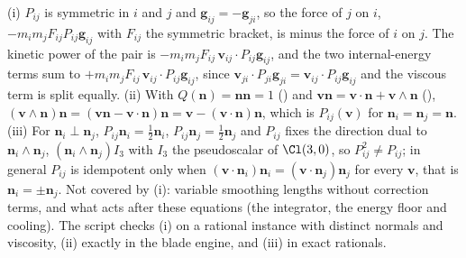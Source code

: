 (i) $P_{ij}$ is symmetric in $i$ and $j$ and $\mathbf{g}_{ij} = -\mathbf{g}_{ji}$, so the force of $j$ on $i$, $-m_{i}m_{j}F_{ij}P_{ij}\mathbf{g}_{ij}$ with $F_{ij}$ the symmetric bracket, is minus the force of $i$ on $j$. The kinetic power of the pair is $-m_{i}m_{j}F_{ij}\,\mathbf{v}_{ij}\cdot P_{ij}\mathbf{g}_{ij}$, and the two internal-energy terms sum to $+m_{i}m_{j}F_{ij}\,\mathbf{v}_{ij}\cdot P_{ij}\mathbf{g}_{ij}$, since $\mathbf{v}_{ji}\cdot P_{ji}\mathbf{g}_{ji} = \mathbf{v}_{ij}\cdot P_{ij}\mathbf{g}_{ij}$ and the viscous term is split equally. (ii) With $Q(\mathbf{n}) = \mathbf{n}\mathbf{n} = 1$ () and $\mathbf{v}\mathbf{n} = \mathbf{v}\cdot\mathbf{n} + \mathbf{v}\wedge\mathbf{n}$ (), $(\mathbf{v}\wedge\mathbf{n})\mathbf{n} = (\mathbf{v}\mathbf{n} - \mathbf{v}\cdot\mathbf{n})\mathbf{n} = \mathbf{v} - (\mathbf{v}\cdot\mathbf{n})\mathbf{n}$, which is $P_{ij}(\mathbf{v})$ for $\mathbf{n}_{i} = \mathbf{n}_{j} = \mathbf{n}$. (iii) For $\mathbf{n}_{i}\perp\mathbf{n}_{j}$, $P_{ij}\mathbf{n}_{i} = \tfrac{1}{2}\mathbf{n}_{i}$, $P_{ij}\mathbf{n}_{j} = \tfrac{1}{2}\mathbf{n}_{j}$ and $P_{ij}$ fixes the direction dual to $\mathbf{n}_{i}\wedge\mathbf{n}_{j}$, $(\mathbf{n}_{i}\wedge\mathbf{n}_{j})I_{3}$ with $I_{3}$ the pseudoscalar of $\Cl(3,0)$, so $P_{ij}^{2} \ne P_{ij}$; in general $P_{ij}$ is idempotent only when $(\mathbf{v}\cdot\mathbf{n}_{i})\mathbf{n}_{i} = (\mathbf{v}\cdot\mathbf{n}_{j})\mathbf{n}_{j}$ for every $\mathbf{v}$, that is $\mathbf{n}_{i} = \pm\mathbf{n}_{j}$. Not covered by (i): variable smoothing lengths without correction terms, and what acts after these equations (the integrator, the energy floor and cooling). The script checks (i) on a rational instance with distinct normals and viscosity, (ii) exactly in the blade engine, and (iii) in exact rationals.
